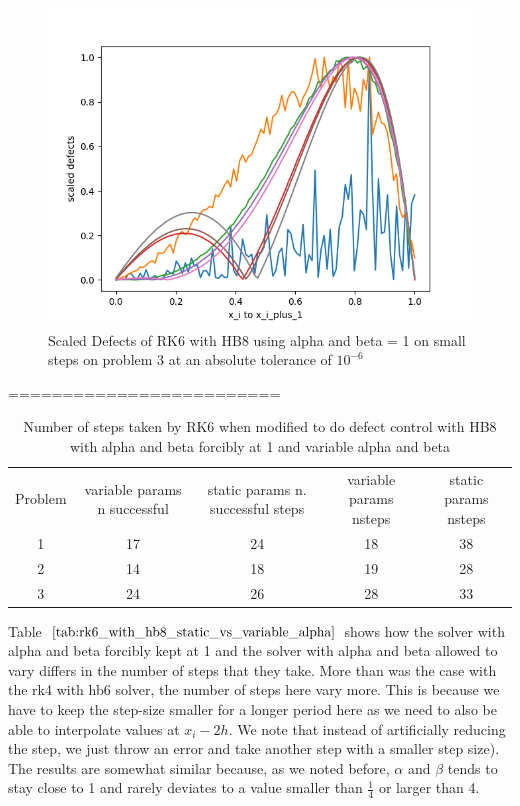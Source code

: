 \documentclass{article}
\begin{document}
\begin{figure}[H]
\centering
\includegraphics[width=0.7\linewidth]{./figures/static_alpha_rk6_with_hb8_p3_scaled_defects_small_steps}
\caption{Scaled Defects of RK6 with HB8 using alpha and beta = 1 on small steps on problem 3 at an absolute tolerance of $10^{-6}$}
\label{fig:static_alpha_rk6_with_hb8_p3_scaled_defects_small_steps}
\end{figure}

=========================

\begin{table}[h]
\caption {Number of steps taken by RK6 when modified to do defect control with HB8 with alpha and beta forcibly at 1 and variable alpha and beta} \label{tab:rk6_with_hb6_vs_hb8_static_vs_variable}
\begin{center}
\begin{tabular}{ c c c c c } 
Problem & variable params n successful & static params n. successful steps & variable params nsteps & static params nsteps \\ 
1       & 17                      &        24               & 18         & 38\\ 
2       & 14                      &        18               & 19         & 28\\
3       & 24                      &        26               & 28         & 33\\
\end{tabular}
\end{center}
\end{table}	


Table $\ref{tab:rk6_with_hb8_static_vs_variable_alpha}$ shows how the solver with alpha and beta forcibly kept at 1 and the solver with alpha and beta allowed to vary differs in the number of steps that they take. More than was the case with the rk4 with hb6 solver, the number of steps here vary more. This is because we have to keep the step-size smaller for a longer period here as we need to also be able to interpolate values at $x_i - 2h$. We note that instead of artificially reducing the step, we just throw an error and take another step with a smaller step size). The results are somewhat similar because, as we noted before, $\alpha$ and $\beta$ tends to stay close to 1 and rarely deviates to a value smaller than $\frac{1}{4}$ or larger than 4.
\end{document}
